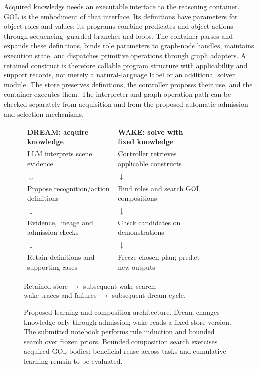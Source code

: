 \documentclass[11pt]{article}
\begin{document}
Acquired knowledge needs an executable interface to the reasoning container. GOL is the embodiment of that interface. Its definitions have parameters for object roles and values; its programs combine predicates and object actions through sequencing, guarded branches and loops. The container parses and expands these definitions, binds role parameters to graph-node handles, maintains execution state, and dispatches primitive operations through graph adapters. A retained construct is therefore callable program structure with applicability and support records, not merely a natural-language label or an additional solver module. The store preserves definitions, the controller proposes their use, and the container executes them. The interpreter and graph-operation path can be checked separately from acquisition and from the proposed automatic admission and selection mechanisms.

\begin{figure}[htbp]
\centering
\small
{}

\medskip
\begin{tabular}{p{0.43\linewidth}p{0.43\linewidth}}
\textbf{DREAM: acquire knowledge} & \textbf{WAKE: solve with fixed knowledge}\\[3pt]
LLM interprets scene evidence & Controller retrieves applicable constructs\\
$\downarrow$ & $\downarrow$\\
Propose recognition/action definitions & Bind roles and search GOL compositions\\
$\downarrow$ & $\downarrow$\\
Evidence, lineage and admission checks & Check candidates on demonstrations\\
$\downarrow$ & $\downarrow$\\
Retain definitions and supporting cases & Freeze chosen plan; predict new outputs
\end{tabular}

\medskip
{}

\medskip
\parbox{0.88\linewidth}{\centering
Retained store $\longrightarrow$ subsequent wake search;\\
wake traces and failures $\longrightarrow$ subsequent dream cycle.}
\caption{Proposed learning and composition architecture. Dream changes knowledge only through admission; wake reads a fixed store version. The submitted notebook performs rule induction and bounded search over frozen priors. Bounded composition search exercises acquired GOL bodies; beneficial reuse across tasks and cumulative learning remain to be evaluated.}
\label{fig:architecture}
\end{figure}
\end{document}
